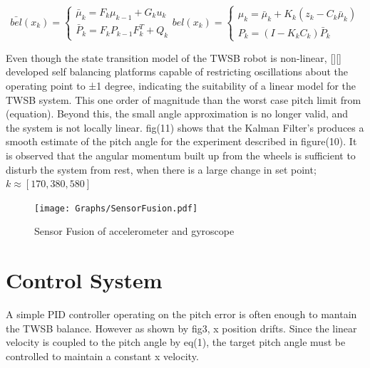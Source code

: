         \begin{subequations}
            \begin{equation}
                \bar{bel}(x_k) = \begin{cases}
                        \bar{\mu}_k = F_k \mu_{k-1} + G_k u_k \\
                        \bar{P}_k = F_k P_{k-1} F_k^T + Q_k
                        \end{cases}
                \end{equation}
            \begin{equation}
            bel(x_k) = \begin{cases}
                \mu_k = \bar{\mu}_k + K_k \left(z_k - C_k \bar{\mu}_k \right) \\
                P_k = \left(I - K_k C_k \right) \bar{P}_k
            \end{cases}
            \end{equation}

        \end{subequations}


        Even though the state transition model of the TWSB robot is non-linear, 
        [][] developed self balancing platforms capable of restricting oscillations about the 
        operating point to ±1 degree, indicating the suitability of a linear model for the TWSB system. 
        This one order of magnitude than the worst case pitch limit from (equation). Beyond this, the 
        small angle approximation is no longer valid, and the system is not locally linear. 
        fig(11) shows that the Kalman Filter's produces a smooth estimate of the pitch angle
        for the experiment described in figure(10). It is observed that the angular momentum built up 
        from the wheels is sufficient to disturb the system from rest, 
        when there is a large change in set point; $k \approx [170, 380, 580]$
        \begin{figure}[H]
            \centering
            \texttt{[image: Graphs/SensorFusion.pdf]}
            
            \caption{Sensor Fusion of accelerometer and gyroscope}
        \end{figure}


        \pagebreak{}
    \section{Control System}
        A simple PID controller operating on the pitch error is often enough to mantain the TWSB balance.
        However as shown by fig3, x position drifts. Since the linear velocity is coupled to the
        pitch angle by eq(1), the target pitch angle must be controlled to maintain a constant x velocity. 

